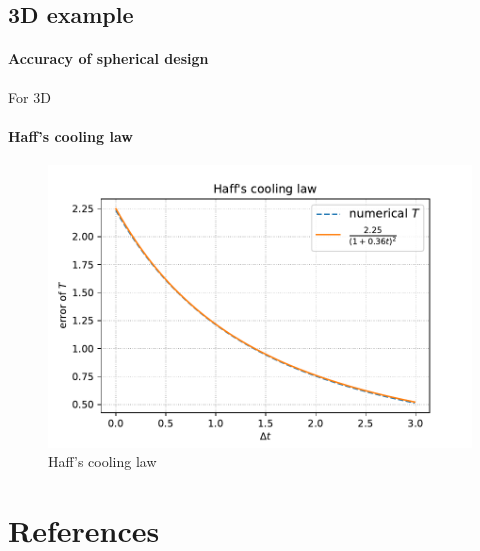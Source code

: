 \documentclass[review, times]{elsarticle}
\begin{document}
\subsection{3D example}


\paragraph{\bf Accuracy of spherical design}
For 3D
\paragraph{\bf Haff's cooling law}
\begin{figure}[htb]
  \centering
  \includegraphics[width = .8\linewidth]{figs/Haff's_cooling}
  \caption{Haff's cooling law}
  \label{Haff_cooling}
\end{figure}


\section*{References}

% 
\end{document}

